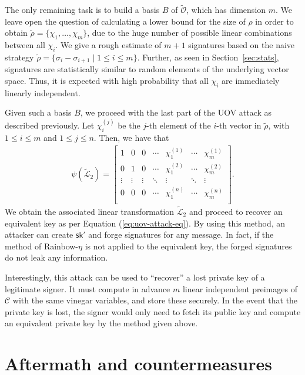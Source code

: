 \documentclass[12pt, a4paper, oneside]{memoir}
\theoremstyle{definition}
\begin{document}
The only remaining task is to build a basis $B$ of $\widetilde{\mathcal{O}}$, which has dimension $m$. We leave open the question of calculating a lower bound for the size of $\rho$ in order to obtain $\widetilde{\rho} = \{ \chi_{1}, \dots, \chi_{m} \}$, due to the huge number of possible linear combinations between all $\chi_{i}$. We give a rough estimate of $m + 1$ signatures based on the naive strategy $\widetilde{\rho} = \{ \sigma_{i} - \sigma_{i + 1} \mid 1 \leq i \leq m \}$. Further, as seen in Section~\ref{sec:stats}, signatures are statistically similar to random elements of the underlying vector space. Thus, it is expected with high probability that all $\chi_{i}$ are immediately linearly independent.

Given such a basis $B$, we proceed with the last part of the UOV attack as described previously. Let $\chi_{i}^{(j)}$ be the $j$-th element of the $i$-th vector in $\widetilde{\rho}$, with $1 \leq i \leq m$ and $1 \leq j \leq n$. Then, we have that
\begin{align}
  \psi(\widetilde{\mathcal{L}}_{2}) = \begin{bmatrix}
    1 & 0 & 0 & \cdots & \chi_{1}^{(1)} & \cdots & \chi_{m}^{(1)} \\
    0 & 1 & 0 & \cdots & \chi_{1}^{(2)} & \cdots & \chi_{m}^{(2)} \\
    \vdots & \vdots & \vdots & \ddots & \vdots & \ddots & \vdots \\
    0 & 0 & 0 & \cdots & \chi_{1}^{(n)} & \cdots & \chi_{m}^{(n)} \\
  \end{bmatrix}.
\end{align}
We obtain the associated linear transformation $\widetilde{\mathcal{L}}_{2}$ and proceed to recover an equivalent key as per Equation (\ref{eq:uov-attack-eq}). By using this method, an attacker can create $\mathsf{sk'}$ and forge signatures for any message. In fact, if the method of Rainbow-$\eta$ is not applied to the equivalent key, the forged signatures do not leak any information. 

Interestingly, this attack can be used to ``recover'' a lost private key of a legitimate signer. It must compute in advance $m$ linear independent preimages of $\mathcal{C}$ with the same vinegar variables, and store these securely. In the event that the private key is lost, the signer would only need to fetch its public key and compute an equivalent private key by the method given above.

\section{Aftermath and countermeasures}\label{sec:counter}
\end{document}
